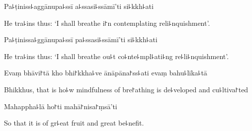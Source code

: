 Pa꜕ṭiniss꜕aggānupa꜕ssī a꜕ssasi꜕ssāmī'ti si꜕kkh꜕ati

\begin{english}
  He tra꜕ins thus: `I shall breathe i꜓n contemplating reli꜕nquishment'.
\end{english}

Pa꜕ṭinissa꜕ggānupa꜕ssī pa꜕ssasi꜕ssāmī'ti si꜕kkh꜕ati

\begin{english}
  He tra꜕ins thus: `I shall breathe ou꜕t co꜕nte꜕mpl꜕ati꜕ng re꜕li꜕nquishment'.
\end{english}

Evaṃ bhāvi꜓tā kho bhi꜓kkha꜕ve ānāpāna꜓ss꜕ati evaṃ bahu꜕līka꜕tā

\begin{english}
  Bhikkhus, that is ho꜕w mindfulness of bre꜓athing is de꜕veloped and cu꜕ltiva꜓ted
\end{english}

Mahappha꜕lā ho꜓ti mahā꜓nisa꜓ṃsā'ti

\begin{english}
  So that it is of gr꜕eat fruit and great be꜕nefit.
\end{english}


